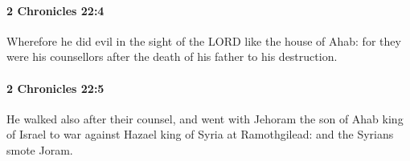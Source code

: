 		\paragraph{2 Chronicles 22:4} %
			\label{2CHRONICLES-22-4}

			Wherefore he did evil in the sight of the LORD like the house of Ahab: for they were his counsellors after the death of his father to his destruction.


		\paragraph{2 Chronicles 22:5} %
			\label{2CHRONICLES-22-5}

			He walked also after their counsel, and went with Jehoram the son of Ahab king of Israel to war against Hazael king of Syria at Ramothgilead: and the Syrians smote Joram.


